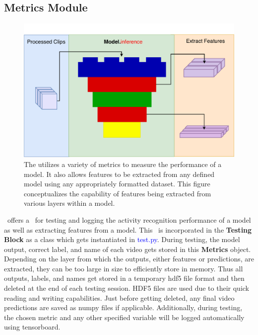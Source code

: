 \documentclass{llncs}
\begin{document}
\subsection{Metrics Module}
\label{sec:metrics}

\begin{figure}[b!]
\centering
\includegraphics[width=0.7\columnwidth]{images/extract_features.pdf}
\caption{The \metrics utilizes a variety of metrics to measure the performance of a model.
It also allows features to be extracted from any defined model using any appropriately formatted dataset.
This figure conceptualizes the capability of features being extracted from various layers within a model.}
\label{fig:extract_features}
\end{figure}

\acro~offers a \metrics~for testing and logging the activity recognition performance of a model as well as extracting features from a model.
This \metrics~is incorporated in the \textbf{Testing Block} as a class which gets instantiated in \textcolor{blue}{test.py}.
During testing, the model output, correct label, and name of each video gets stored in this \textbf{Metrics} object.
Depending on the layer from which the outputs, either features or predictions, are extracted, they can be too large in size to efficiently store in memory.
Thus all outputs, labels, and names get stored in a temporary hdf5 file format and then deleted at the end of each testing session.
HDF5 files are used due to their quick reading and writing capabilities.
Just before getting deleted, any final video predictions are saved as numpy files if applicable.
Additionally, during testing, the chosen metric and any other specified variable will be logged automatically using tensorboard.
\end{document}
